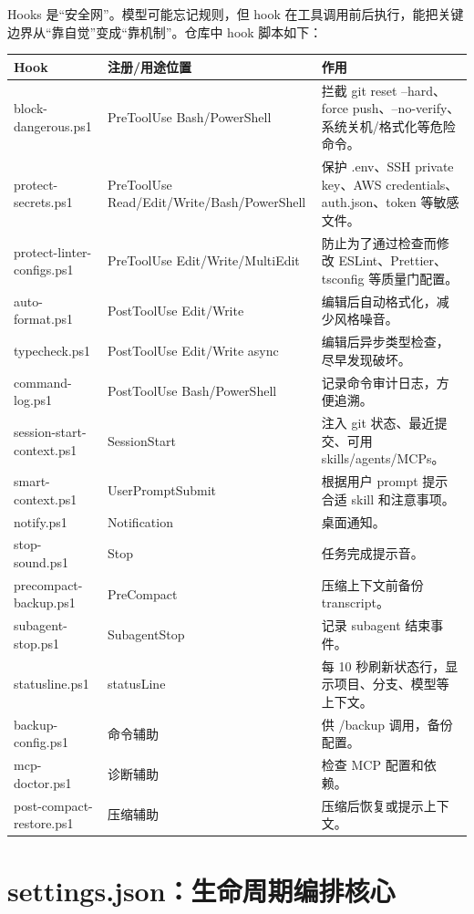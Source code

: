 \documentclass[11pt,a4paper]{ctexbook}
\begin{document}
Hooks 是“安全网”。模型可能忘记规则，但 hook 在工具调用前后执行，能把关键边界从“靠自觉”变成“靠机制”。仓库中 hook 脚本如下：

\begin{longtable}{p{}p{}p{}}
\toprule
Hook & 注册/用途位置 & 作用 \\
\midrule
block-dangerous.ps1 & PreToolUse Bash/PowerShell & 拦截 git reset --hard、force push、--no-verify、系统关机/格式化等危险命令。 \\
protect-secrets.ps1 & PreToolUse Read/Edit/Write/Bash/PowerShell & 保护 .env、SSH private key、AWS credentials、auth.json、token 等敏感文件。 \\
protect-linter-configs.ps1 & PreToolUse Edit/Write/MultiEdit & 防止为了通过检查而修改 ESLint、Prettier、tsconfig 等质量门配置。 \\
auto-format.ps1 & PostToolUse Edit/Write & 编辑后自动格式化，减少风格噪音。 \\
typecheck.ps1 & PostToolUse Edit/Write async & 编辑后异步类型检查，尽早发现破坏。 \\
command-log.ps1 & PostToolUse Bash/PowerShell & 记录命令审计日志，方便追溯。 \\
session-start-context.ps1 & SessionStart & 注入 git 状态、最近提交、可用 skills/agents/MCPs。 \\
smart-context.ps1 & UserPromptSubmit & 根据用户 prompt 提示合适 skill 和注意事项。 \\
notify.ps1 & Notification & 桌面通知。 \\
stop-sound.ps1 & Stop & 任务完成提示音。 \\
precompact-backup.ps1 & PreCompact & 压缩上下文前备份 transcript。 \\
subagent-stop.ps1 & SubagentStop & 记录 subagent 结束事件。 \\
statusline.ps1 & statusLine & 每 10 秒刷新状态行，显示项目、分支、模型等上下文。 \\
backup-config.ps1 & 命令辅助 & 供 /backup 调用，备份配置。 \\
mcp-doctor.ps1 & 诊断辅助 & 检查 MCP 配置和依赖。 \\
post-compact-restore.ps1 & 压缩辅助 & 压缩后恢复或提示上下文。 \\
\bottomrule
\end{longtable}

\section{settings.json：生命周期编排核心}
\end{document}
